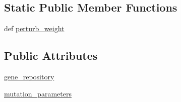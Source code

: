 \subsection*{Static Public Member Functions}
\begin{DoxyCompactItemize}
\item 
def \hyperlink{classNEAT__PyGenetics_1_1NEAT_1_1Generator_1_1Mutator_1_1Mutator_ae8e05c9ff54df03a83a0809a7ba1f00a}{perturb\+\_\+weight}
\end{DoxyCompactItemize}
\subsection*{Public Attributes}
\begin{DoxyCompactItemize}
\item 
\hyperlink{classNEAT__PyGenetics_1_1NEAT_1_1Generator_1_1Mutator_1_1Mutator_afa98da8eee10b2a4e9c653238dbbbe2c}{gene\+\_\+repository}
\item 
\hyperlink{classNEAT__PyGenetics_1_1NEAT_1_1Generator_1_1Mutator_1_1Mutator_a3339255b05437da752358f068835bc26}{mutation\+\_\+parameters}
\end{DoxyCompactItemize}
